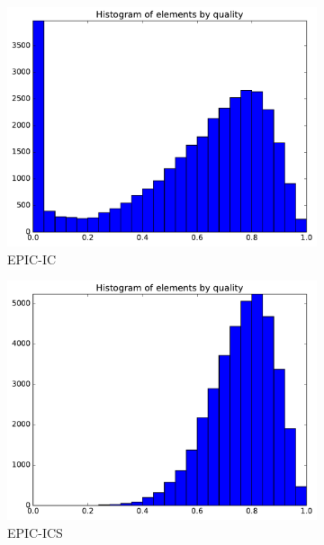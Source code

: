 \documentclass[3p,times,procedia,number]{elsarticle}
\begin{document}
\begin{figure}
\begin{subfigure}{.24\textwidth}
\centering
\includegraphics[width=\textwidth]{epic-ic-cube-cylinder-linear-quality.pdf}
\caption{EPIC-IC}
\end{subfigure}
\begin{subfigure}{.24\textwidth}
\centering
\includegraphics[width=\textwidth]{epic-ics-cube-cylinder-linear-quality.pdf}
\caption{EPIC-ICS}
\end{subfigure}
\begin{subfigure}{.24\textwidth}
\centering

\end{subfigure}
\end{figure}
\end{document}
